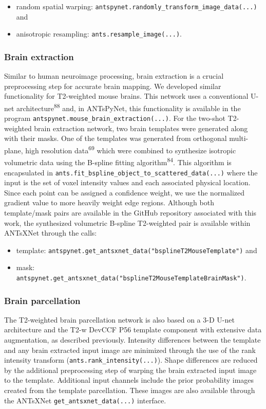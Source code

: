 \documentclass[
  12pt,
]{article}
\begin{document}
\begin{itemize}
\item
  random spatial warping:
  \texttt{antspynet.randomly\_transform\_image\_data(...)} and
\item
  anisotropic resampling: \texttt{ants.resample\_image(...)}.
\end{itemize}

\subsubsection{Brain extraction}\label{brain-extraction}

Similar to human neuroimage processing, brain extraction is a crucial
preprocessing step for accurate brain mapping. We developed similar
functionality for T2-weighted mouse brains. This network uses a
conventional U-net architecture\textsuperscript{88} and, in ANTsPyNet,
this functionality is available in the program
\texttt{antspynet.mouse\_brain\_extraction(...)}. For the two-shot
T2-weighted brain extraction network, two brain templates were generated
along with their masks. One of the templates was generated from
orthogonal multi-plane, high resolution data\textsuperscript{69} which
were combined to synthesize isotropic volumetric data using the B-spline
fitting algorithm\textsuperscript{84}. This algorithm is encapsulated in
\texttt{ants.fit\_bspline\_object\_to\_scattered\_data(...)} where the
input is the set of voxel intensity values and each associated physical
location. Since each point can be assigned a confidence weight, we use
the normalized gradient value to more heavily weight edge regions.
Although both template/mask pairs are available in the GitHub repository
associated with this work, the synthesized volumetric B-spline
T2-weighted pair is available within ANTsXNet through the calls:

\begin{itemize}
\item
  template:
  \texttt{antspynet.get\_antsxnet\_data("bsplineT2MouseTemplate")} and
\item
  mask:
  \texttt{antspynet.get\_antsxnet\_data("bsplineT2MouseTemplateBrainMask")}.
\end{itemize}

\subsubsection{Brain parcellation}\label{brain-parcellation}

The T2-weighted brain parcellation network is also based on a 3-D U-net
architecture and the T2-w DevCCF P56 template component with extensive
data augmentation, as described previously. Intensity differences
between the template and any brain extracted input image are minimized
through the use of the rank intensity transform
(\texttt{ants.rank\_intensity(...)}). Shape differences are reduced by
the additional preprocessing step of warping the brain extracted input
image to the template. Additional input channels include the prior
probability images created from the template parcellation. These images
are also available through the ANTsXNet
\texttt{get\_antsxnet\_data(...)} interface.
\end{document}

